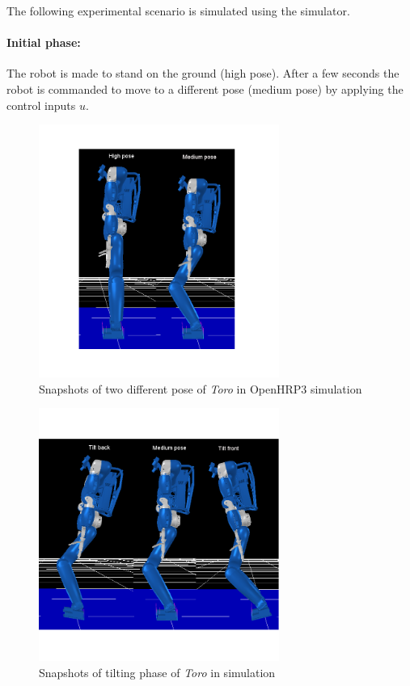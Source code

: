 The following experimental scenario is simulated using the simulator. 

\paragraph{Initial phase: } The robot is made to stand on the ground (high pose). After a few seconds the robot is commanded to move to a different pose (medium pose) by applying the control inputs $u$. 

\begin{figure}
	\centering
	\includegraphics[width=0.7\textwidth,height=0.4\textheight]{Bilder/toro_high_medium.png}
	\caption{Snapshots of two different pose of \emph{Toro} in OpenHRP3 simulation}
	\label{fig:toro_sim_high_low}
\end{figure}
\begin{figure}
	\centering
	\includegraphics[width=0.7\textwidth, height=0.4\textheight]{Bilder/toro_tiltphase.png}
	\caption{Snapshots of tilting phase of \emph{Toro} in simulation}
	\label{fig:toro_tiltphase}
\end{figure}

